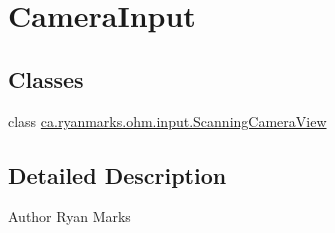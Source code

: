 \hypertarget{group___camera_input}{}\section{Camera\+Input}
\label{group___camera_input}
\subsection*{Classes}
\begin{DoxyCompactItemize}
\item 
class \hyperlink{classca_1_1ryanmarks_1_1ohm_1_1input_1_1_scanning_camera_view}{ca.\+ryanmarks.\+ohm.\+input.\+Scanning\+Camera\+View}
\end{DoxyCompactItemize}


\subsection{Detailed Description}
\begin{DoxyAuthor}{Author}
Ryan Marks 
\end{DoxyAuthor}
